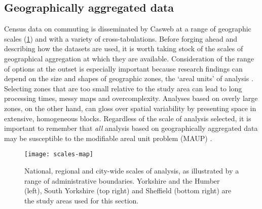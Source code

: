 \subsection{Geographically aggregated data} %
\label{sgeoaggdata}
Census data on commuting is disseminated by Casweb at a range of geographic
scales (\cref{f:scales}) and with a variety of cross-tabulations. Before
forging ahead and describing how the datasets are used, it is worth taking stock
of the scales of geographical aggregation at which they are available.
Consideration of the range
of options at the outset is especially important because research
findings can depend on the size and shapes of geographic zones,
the `areal units' of analysis \citep{Horner2002, Openshaw1983}. Selecting zones
that are too small relative to the study  
area can lead to long processing times, messy maps and overcomplexity.
Analyses based on overly large zones, on the other hand, can gloss over
spatial variability by presenting space in extensive, homogeneous blocks.
Regardless of the scale of analysis selected, it is important to remember that
\emph{all} analysis based on geographically aggregated data may be susceptible
to the modifiable areal unit problem (MAUP) \citep{Wong2009}.

\begin{figure}
\texttt{[image: scales-map]}
\caption[National, regional and city-wide scales of analysis]{National, regional
and city-wide scales of analysis, as illustrated
by a range of administrative boundaries. Yorkshire and the Humber (left),
South Yorkshire (top right) and Sheffield (bottom right)
are the study areas used for this section.}
\label{f:scales}
\end{figure}

